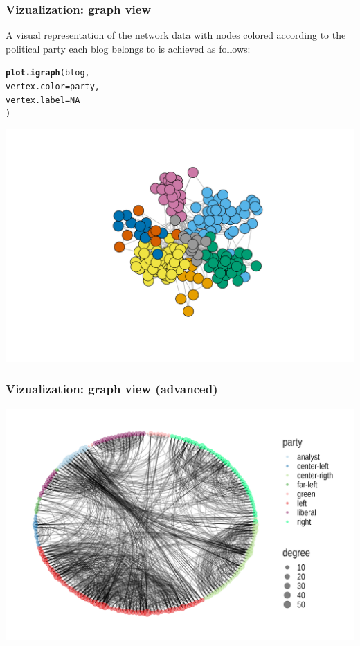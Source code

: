 \documentclass{beamer}\usepackage[]{graphicx}\usepackage[]{color}
\makeatletter
\newcommand{\hlnum}[1]{\textcolor[rgb]{0.686,0.059,0.569}{#1}}%
\newcommand{\hlstd}[1]{\textcolor[rgb]{0.345,0.345,0.345}{#1}}%
\newcommand{\hlkwc}[1]{\textcolor[rgb]{0.333,0.667,0.333}{#1}}%
\newcommand{\hlkwd}[1]{\textcolor[rgb]{0.737,0.353,0.396}{\textbf{#1}}}%
\newenvironment{kframe}{%
 \def\at@end@of@kframe{}%
 \ifinner\ifhmode%
  \def\at@end@of@kframe{\end{minipage}}%
  \begin{minipage}{\columnwidth}%
 \fi\fi%
 \def\FrameCommand##1{\hskip\@totalleftmargin \hskip-\fboxsep
 \colorbox{shadecolor}{##1}\hskip-\fboxsep
     \hskip-\linewidth \hskip-\@totalleftmargin \hskip\columnwidth}%
 \MakeFramed {\advance\hsize-\width
   \@totalleftmargin\z@ \linewidth\hsize
   \@setminipage}}%
 {\par\unskip\endMakeFramed%
 \at@end@of@kframe}
\newenvironment{knitrout}{}{} %
\makeatother
\begin{document}
\begin{frame}[fragile]
  \frametitle{Vizualization: graph view}

A visual representation of the network data with nodes colored according to the political party each blog belongs to is achieved as follows:

\begin{knitrout}\scriptsize
{}\color{fgcolor}\begin{kframe}
\begin{alltt}
\hlkwd{plot.igraph}\hlstd{(blog,}
  \hlkwc{vertex.color} \hlstd{= party,}
  \hlkwc{vertex.label} \hlstd{=} \hlnum{NA}
 \hlstd{)}
\end{alltt}
\end{kframe}
\includegraphics[width=.8\textwidth]{figures/frenchblog-igraph-plot-1} 
\end{knitrout}

\end{frame}

\begin{frame}[fragile]
  \frametitle{Vizualization: graph view (advanced)}



\includegraphics[height=.9\textheight]{figures/fancy_frenchblog2007.png}

\end{frame}
\end{document}
